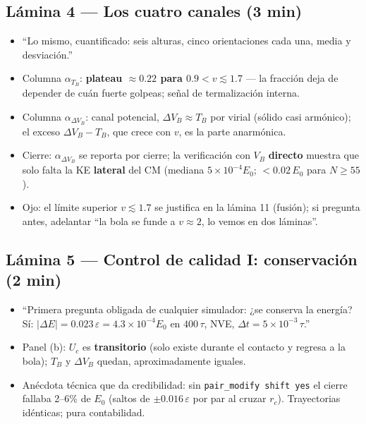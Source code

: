 \documentclass[11pt]{article}
\newcommand{\eps}{\varepsilon}
\newcommand{\clave}[1]{\textcolor{red!60!black}{\textbf{#1}}}
\begin{document}
\subsection*{Lámina 4 --- Los cuatro canales (3 min)}
\begin{itemize}[leftmargin=1.4em]
    \item ``Lo mismo, cuantificado: seis alturas, cinco orientaciones
    cada una, media y desviación.''
    \item Columna $\alpha_{T_B}$: \clave{plateau $\approx0.22$ para
    $0.9<v\lesssim1.7$} --- la fracción deja de depender de cuán fuerte
    golpeas; señal de termalización interna.
    \item Columna $\alpha_{\Delta V_B}$: canal potencial,
    $\Delta V_B\approx T_B$ por virial (sólido casi armónico); el exceso
    $\Delta V_B-T_B$, que crece con $v$, es la parte anarmónica.
    \item Cierre: $\alpha_{\Delta V_B}$ se reporta por cierre; la
    verificación con $V_B$ \clave{directo} muestra que solo falta la KE
    \clave{lateral} del CM (mediana $5\times10^{-4}E_0$;
    $<0.02\,E_0$ para $N\ge55$).
    \item Ojo: el límite superior $v\lesssim1.7$ se justifica en la
    lámina 11 (fusión); si pregunta antes, adelantar ``la bola se funde a
    $v\approx2$, lo vemos en dos láminas''.
\end{itemize}

\subsection*{Lámina 5 --- Control de calidad I: conservación (2 min)}
\begin{itemize}[leftmargin=1.4em]
    \item ``Primera pregunta obligada de cualquier simulador: ¿se
    conserva la energía? Sí: $|\Delta E|=0.023\,\eps=4.3\times10^{-4}E_0$
    en $400\,\tau$, NVE, $\Delta t=5\times10^{-3}\,\tau$.''
    \item Panel (b): $U_c$ es \clave{transitorio} (solo existe durante el
    contacto y regresa a la bola); $T_B$ y $\Delta V_B$ quedan,
    aproximadamente iguales.
    \item Anécdota técnica que da credibilidad: sin
    \texttt{pair\_modify shift yes} el cierre fallaba 2--6\% de $E_0$
    (saltos de $\pm0.016\,\eps$ por par al cruzar $r_c$). Trayectorias
    idénticas; pura contabilidad.
\end{itemize}
\end{document}
